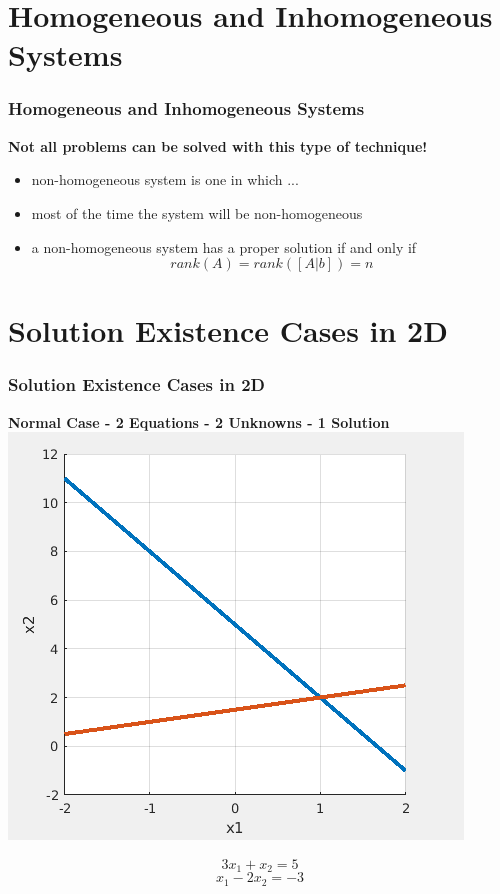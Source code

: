 \documentclass[fleqn]{beamer} %
\newcommand{\sectiontitleII}{Homogeneous and Inhomogeneous Systems}
\newcommand{\sectiontitleIII}{Solution Existence Cases in 2D}
\begin{document}
\section{\sectiontitleII}

\begin{frame}[label=sectionII] \small 
  \frametitle{\sectiontitleII}
	 \textbf{ Not all problems can be solved with this type of technique!} \\	
	\begin{itemize}
		\item {\PR non-homogeneous} system is one in which ... \vspace{10mm}\\
		\item most of the time the system will be {\PR non-homogeneous} \vspace{10mm}\\
		\item a {\PR non-homogeneous} system has a {\B proper solution} if and only if\vspace{2mm}\\
		\[rank(A)=rank([A | b])=n\]
	\end{itemize}
  
\end{frame}

\section{\sectiontitleIII}

\begin{frame}[label=sectionIII] \small 
  \frametitle{\sectiontitleIII}
  {\bf Normal Case - 2 Equations - 2 Unknowns - 1 Solution} \\ \vspace{2mm}
  \includegraphics[scale=.3]{lecture5_fig1.png} \\
  \begin{fleqn}
\[3x_1+x_2=5\]
\[x_1-2x_2=-3\]
  \end{fleqn}
\end{frame}
  
\end{document}
